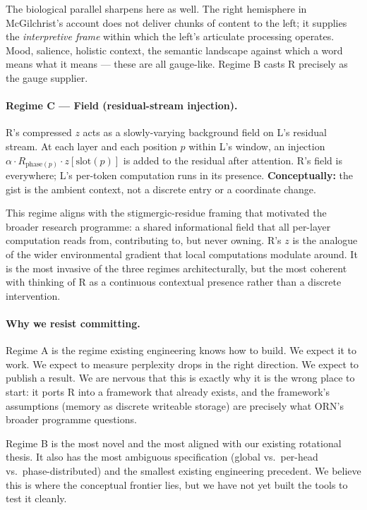 \documentclass[10pt, twocolumn, a4paper]{article}
\begin{document}
The biological parallel sharpens here as well. The right hemisphere in McGilchrist's account does not deliver chunks of content to the left; it supplies the \emph{interpretive frame} within which the left's articulate processing operates. Mood, salience, holistic context, the semantic landscape against which a word means what it means --- these are all gauge-like. Regime B casts R precisely as the gauge supplier.

\paragraph{Regime C --- Field (residual-stream injection).}
R's compressed $z$ acts as a slowly-varying background field on L's residual stream. At each layer and each position $p$ within L's window, an injection $\alpha \cdot R_{\text{phase}(p)} \cdot z[\text{slot}(p)]$ is added to the residual after attention. R's field is everywhere; L's per-token computation runs in its presence. \textbf{Conceptually:} the gist is the ambient context, not a discrete entry or a coordinate change.

This regime aligns with the stigmergic-residue framing that motivated the broader research programme: a shared informational field that all per-layer computation reads from, contributing to, but never owning. R's $z$ is the analogue of the wider environmental gradient that local computations modulate around. It is the most invasive of the three regimes architecturally, but the most coherent with thinking of R as a continuous contextual presence rather than a discrete intervention.

\paragraph{Why we resist committing.}
Regime A is the regime existing engineering knows how to build. We expect it to work. We expect to measure perplexity drops in the right direction. We expect to publish a result. We are nervous that this is exactly why it is the wrong place to start: it ports R into a framework that already exists, and the framework's assumptions (memory as discrete writeable storage) are precisely what ORN's broader programme questions.

Regime B is the most novel and the most aligned with our existing rotational thesis. It also has the most ambiguous specification (global vs.~per-head vs.~phase-distributed) and the smallest existing engineering precedent. We believe this is where the conceptual frontier lies, but we have not yet built the tools to test it cleanly.
\end{document}
